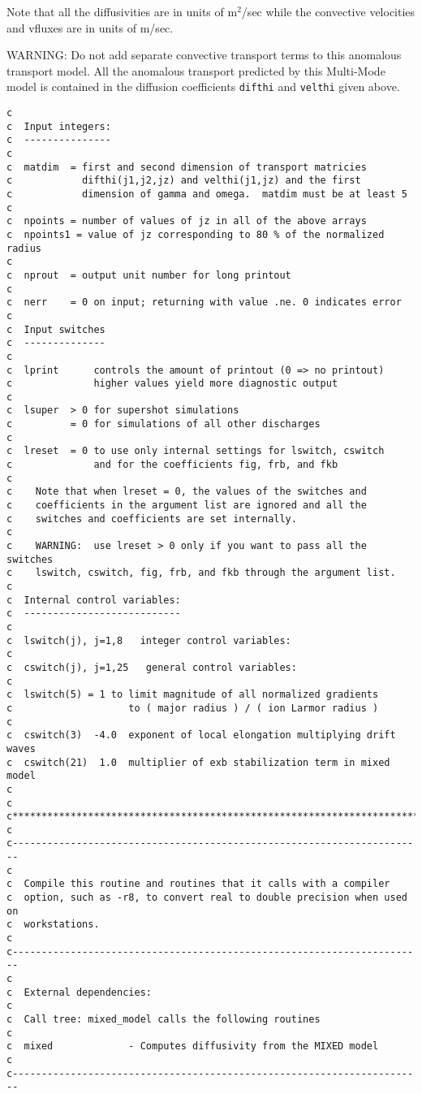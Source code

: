 Note that all the diffusivities are in units of m$^2$/sec while the
convective velocities and vfluxes are in units of m/sec.

WARNING:  Do not add separate convective transport terms to this
anomalous transport model.  All the anomalous transport 
predicted by this Multi-Mode model is contained
in the diffusion coefficients {\tt difthi} and {\tt velthi} given
above.

\begin{verbatim}
c
c  Input integers:
c  ---------------
c
c  matdim  = first and second dimension of transport matricies
c            difthi(j1,j2,jz) and velthi(j1,jz) and the first 
c            dimension of gamma and omega.  matdim must be at least 5
c
c  npoints = number of values of jz in all of the above arrays
c  npoints1 = value of jz corresponding to 80 % of the normalized radius
c
c  nprout  = output unit number for long printout
c
c  nerr    = 0 on input; returning with value .ne. 0 indicates error
c
c  Input switches
c  --------------
c
c  lprint      controls the amount of printout (0 => no printout)
c              higher values yield more diagnostic output
c
c  lsuper  > 0 for supershot simulations
c          = 0 for simulations of all other discharges
c
c  lreset  = 0 to use only internal settings for lswitch, cswitch
c              and for the coefficients fig, frb, and fkb
c
c    Note that when lreset = 0, the values of the switches and
c    coefficients in the argument list are ignored and all the 
c    switches and coefficients are set internally.
c
c    WARNING:  use lreset > 0 only if you want to pass all the switches
c    lswitch, cswitch, fig, frb, and fkb through the argument list.
c
c  Internal control variables:
c  ---------------------------
c
c  lswitch(j), j=1,8   integer control variables: 
c
c  cswitch(j), j=1,25   general control variables:
c
c  lswitch(5) = 1 to limit magnitude of all normalized gradients
c                    to ( major radius ) / ( ion Larmor radius )
c
c  cswitch(3)  -4.0  exponent of local elongation multiplying drift waves
c  cswitch(21)  1.0  multiplier of exb stabilization term in mixed model
c
c
c***********************************************************************
c
c-----------------------------------------------------------------------
c
c  Compile this routine and routines that it calls with a compiler 
c  option, such as -r8, to convert real to double precision when used on 
c  workstations.
c
c-----------------------------------------------------------------------
c
c  External dependencies:
c
c  Call tree: mixed_model calls the following routines
c
c  mixed             - Computes diffusivity from the MIXED model
c
c-----------------------------------------------------------------------


\end{verbatim}
